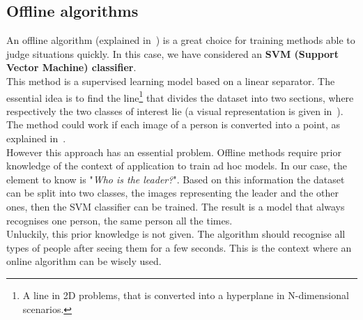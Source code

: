 \subsection{Offline algorithms}
An offline algorithm (explained in~) is a great choice for training methods able to judge situations quickly. In this case, we have considered an \textbf{SVM (Support Vector Machine) classifier}.\\
This method is a supervised learning model based on a linear separator. The essential idea is to find the line\footnote{A line in 2D problems, that is converted into a hyperplane in N-dimensional scenarios.} that divides the dataset into two sections, where respectively the two classes of interest lie (a visual representation is given in~). The method could work if each image of a person is converted into a point, as explained in~.\\
However this approach has an essential problem. Offline methods require prior knowledge of the context of application to train ad hoc models. In our case, the element to know is "\textit{Who is the leader?}". Based on this information the dataset can be split into two classes, the images representing the leader and the other ones, then the SVM classifier can be trained. The result is a model that always recognises one person, the same person all the times.\\
Unluckily, this prior knowledge is not given. The algorithm should recognise all types of people after seeing them for a few seconds. This is the context where an online algorithm can be wisely used.
